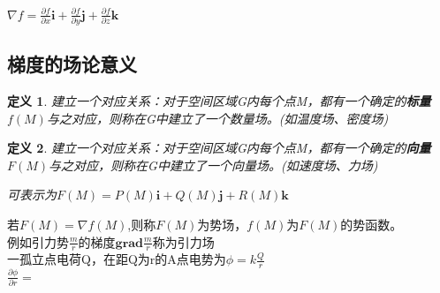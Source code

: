 \documentclass[UTF8]{ctexart}
\newtheorem{deff}{定义}
\begin{document}
			$\nabla f= \frac{\partial f}{\partial x} \textbf{i}
					+\frac{\partial f}{\partial y} \textbf{j}			
					+\frac{\partial f}{\partial z} \textbf{k}
			$
		\subsection{梯度的场论意义}
			\begin{deff}
			建立一个对应关系：对于空间区域G内每个点M，都有一个确定的\textbf{标量}$f(M)$与之对应，则称在G中建立了一个数量场。(如温度场、密度场)
			\end{deff}
			
			\begin{deff}
			建立一个对应关系：对于空间区域G内每个点M，都有一个确定的\textbf{向量}$F(M)$与之对应，则称在G中建立了一个向量场。(如速度场、力场)
			  
			可表示为$F(M)=P(M) \textbf{i}+Q(M) \textbf{j}+R(M) \textbf{k}$
			\end{deff}
  
  
			若$F(M)= \nabla f(M)$,则称$F(M)$为势场，$f(M)$为$F(M)$的势函数。\\
			例如引力势$\frac{m}{r}$的梯度$\textbf{grad}\frac{m}{r}$称为引力场\\
			一孤立点电荷Q，在距Q为r的A点电势为$\phi=k \frac{Q}{r}$\\
			$\frac{\partial{\phi}}{\partial{r}}= $
			
\end{document}
